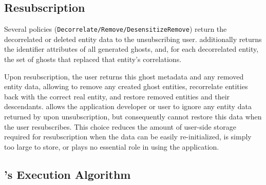 \subsection{Resubscription}
Several policies (\texttt{Decorrelate/Remove/Desensitize\-Remove}) return the decorrelated or deleted
entity data to the unsubscribing user. \sys additionally returns the identifier attributes of all
generated ghosts, and, for each decorrelated entity, the set of ghosts that replaced that entity's
correlations.

Upon resubscription, the user returns this ghost metadata and any removed entity data, allowing \sys
to remove any created ghost entities, recorrelate entities back with the correct real entity, and
restore removed entities and their descendants. \sys allows the application developer or user to
ignore any entity data returned by \sys upon unsubscription, but consequently cannot restore this
data when the user resubscribes.  This choice reduces the amount of user-side storage required for
resubscription when the data can be easily re-initialized, is simply too large to store, or plays no
essential role in using the application.
        
\subsection{\sys's Execution Algorithm}


